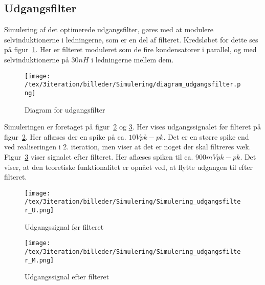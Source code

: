 
\subsection{Udgangsfilter}
Simulering af det optimerede udgangsfilter, gøres med at modulere selvinduktionerne i ledningerne, som er en del af filteret. Kredsløbet for dette ses på figur~\ref{fig:diagram_udgangsfilter_3}. Her er filteret moduleret som de fire kondensatorer i parallel, og med selvinduktionerne på $30nH$ i ledningerne mellem dem. 

\begin{figure}[H]
	\center
	\texttt{[image: /tex/3iteration/billeder/Simulering/diagram\_udgangsfilter.png]}
	\caption{Diagram for udgangsfilter}
	\label{fig:diagram_udgangsfilter_3}
\end{figure}

Simuleringen er foretaget på figur~\ref{fig:simulering_udgangsfilter_U} og \ref{fig:simulering_udgangsfilter_M}. Her vises udgangssignalet før filteret på figur~\ref{fig:simulering_udgangsfilter_U}. Her aflæses der en spike på ca. $10V pk-pk$. Det er en større spike end ved realiseringen i 2. iteration, men viser at det er noget der skal filtreres væk. Figur~\ref{fig:simulering_udgangsfilter_M} viser signalet efter filteret. Her aflæses spiken til ca. $900mV pk-pk$. Det viser, at den teoretiske funktionalitet er opnået ved, at flytte udgangen til efter filteret. 

\begin{figure}[H]
	\center
	\texttt{[image: /tex/3iteration/billeder/Simulering/Simulering\_udgangsfilter\_U.png]}
	\caption{Udgangssignal før filteret}
	\label{fig:simulering_udgangsfilter_U}
\end{figure}

\begin{figure}[H]
	\center
	\texttt{[image: /tex/3iteration/billeder/Simulering/Simulering\_udgangsfilter\_M.png]}
	\caption{Udgangssignal efter filteret}
	\label{fig:simulering_udgangsfilter_M}
\end{figure}
